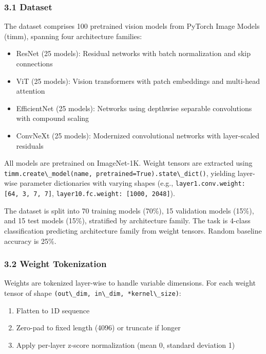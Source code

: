 
\subsubsection{3.1 Dataset}

The dataset comprises 100 pretrained vision models from PyTorch Image Models (timm), spanning four architecture families:

\begin{itemize}
\item ResNet (25 models): Residual networks with batch normalization and skip connections
\item ViT (25 models): Vision transformers with patch embeddings and multi-head attention
\item EfficientNet (25 models): Networks using depthwise separable convolutions with compound scaling
\item ConvNeXt (25 models): Modernized convolutional networks with layer-scaled residuals
\end{itemize}

All models are pretrained on ImageNet-1K. Weight tensors are extracted using \texttt{timm.create\textbackslash \_model(name, pretrained=True).state\textbackslash \_dict()}, yielding layer-wise parameter dictionaries with varying shapes (e.g., \texttt{layer1.conv.weight: [64, 3, 7, 7]}, \texttt{layer10.fc.weight: [1000, 2048]}).

The dataset is split into 70 training models (70\%), 15 validation models (15\%), and 15 test models (15\%), stratified by architecture family. The task is 4-class classification predicting architecture family from weight tensors. Random baseline accuracy is 25\%.

\subsubsection{3.2 Weight Tokenization}

Weights are tokenized layer-wise to handle variable dimensions. For each weight tensor of shape \texttt{(out\textbackslash \_dim, in\textbackslash \_dim, *kernel\textbackslash \_size)}:

\begin{enumerate}
\item Flatten to 1D sequence  
\item Zero-pad to fixed length (4096) or truncate if longer  
\item Apply per-layer z-score normalization (mean 0, standard deviation 1)  
\end{enumerate}

